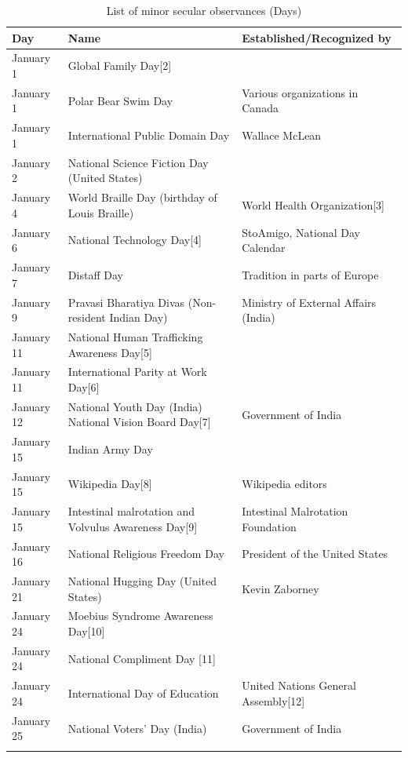 \documentclass[
]{book}
\begin{document}
\begin{longtable}[t]{>{\raggedright\arraybackslash}p{8em}>{\raggedright\arraybackslash}p{20em}>{\raggedright\arraybackslash}p{12em}}
\caption{\label{tab:day-observances}List of minor secular observances (Days)}\\
\toprule
Day & Name & Established/Recognized by\\
\midrule
January 1 & Global Family Day[2] & \\
January 1 & Polar Bear Swim Day & Various organizations in Canada\\
January 1 & International Public Domain Day & Wallace McLean\\
January 2 & National Science Fiction Day (United States) & \\
January 4 & World Braille Day (birthday of Louis Braille) & World Health Organization[3]\\
\addlinespace
January 6 & National Technology Day[4] & StoAmigo, National Day Calendar\\
January 7 & Distaff Day & Tradition in parts of Europe\\
January 9 & Pravasi Bharatiya Divas (Non-resident Indian Day) & Ministry of External Affairs (India)\\
January 11 & National Human Trafficking Awareness Day[5] & \\
January 11 & International Parity at Work Day[6] & \\
\addlinespace
January 12 & National Youth Day (India)
National Vision Board Day[7] & Government of India\\
January 15 & Indian Army Day & \\
January 15 & Wikipedia Day[8] & Wikipedia editors\\
January 15 & Intestinal malrotation and Volvulus Awareness Day[9] & Intestinal Malrotation Foundation\\
January 16 & National Religious Freedom Day & President of the United States\\
\addlinespace
January 21 & National Hugging Day (United States) & Kevin Zaborney\\
January 24 & Moebius Syndrome Awareness Day[10] & \\
January 24 & National Compliment Day [11] & \\
January 24 & International Day of Education & United Nations General Assembly[12]\\
January 25 & National Voters' Day (India) & Government of India\\
\addlinespace

\end{longtable}
\end{document}
